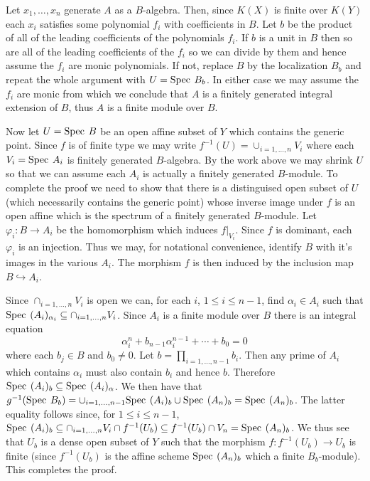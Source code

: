 \documentclass[12pt]{article}
\renewcommand{\phi}{\varphi}
\newcommand{\spec}{\mbox{\rm Spec \hspace{.01in}}}
\begin{document}
Let $x_1,\ldots,x_n$ generate $A$ as a $B$-algebra. Then,
since $K(X)$ is finite over $K(Y)$ each $x_i$ satisfies
some polynomial $f_i$ with coefficients in $B$. Let $b$ be the
product of all of the leading coefficients of the polynomials
$f_i$. If $b$ is a unit in $B$ then so are all of the leading
coefficients of the $f_i$ so we can divide by them and hence assume
the $f_i$ are monic polynomials. If not, replace $B$ by the localization
$B_b$ and repeat the whole argument with $U=\spec B_b$.  
In either case we may assume the $f_i$ are monic from which
we conclude that $A$ is a finitely generated integral extension
of $B$, thus $A$ is a finite module over $B$. 

Now let $U=\spec B$ be an open affine subset of $Y$ which contains the
generic point. Since $f$ is of finite type we may write
$f^{-1}(U)=\cup_{i=1,\ldots,n}V_i$ where each $V_i=\spec A_i$ is
finitely generated $B$-algebra. By the work above we may shrink
$U$ so that we can assume each $A_i$ is actually a finitely
generated $B$-module. To complete the proof we need to show that
there is a distinguised open subset of $U$ (which necessarily
contains the generic point) whose inverse image under $f$ is an 
open affine which is the spectrum of a finitely generated $B$-module. 
Let $\phi_i:B\rightarrow A_i$ be the homomorphism which
induces $f|_{V_i}$. Since $f$ is dominant, each $\phi_i$
is an injection. Thus we may, for notational convenience,
identify $B$ with it's images in the various $A_i$. The
morphism $f$ is then induced by the inclusion map
$B\hookrightarrow A_i$.  

Since $\cap_{i=1,\ldots,n}V_i$ is open we can,
for each $i$, $1\leq i \leq n-1$, find $\alpha_i\in A_i$
such that $\spec (A_i)_{\alpha_i}\subseteq \cap_{i=1,\ldots,n}V_i$.
Since $A_i$ is a finite module over $B$ there is an
integral equation 
$$\alpha_i^n+b_{n-1}\alpha_i^{n-1}+\cdots+b_0=0$$
where each $b_j\in B$ and $b_0\not=0$. 
Let $b=\prod_{i=1,\ldots,n-1}b_i$. Then any
prime of $A_i$ which contains $\alpha_i$ must
also contain $b_i$ and hence $b$. Therefore
$\spec (A_i)_{b}\subseteq \spec (A_i)_{\alpha}$. 
We then have that
$g^{-1}(\spec B_b) 
= \cup_{i=1,\ldots,n-1}\spec (A_i)_b\cup\spec(A_n)_b
= \spec(A_n)_b$. 
The latter equality follows since, for $1\leq i\leq n-1$, 
$\spec(A_i)_b\subseteq \cap_{i=1,\ldots,n} V_i \cap f^{-1}(U_b)
\subseteq f^{-1}(U_b)\cap V_n = \spec (A_n)_b$.
We thus see that $U_b$ is a dense open
subset of $Y$ such that the morphism $f:f^{-1}(U_b)\rightarrow U_b$
is finite (since $f^{-1}(U_b)$ is the affine scheme $\spec(A_n)_b$
which a finite $B_b$-module). This completes the proof. 
\end{document}
